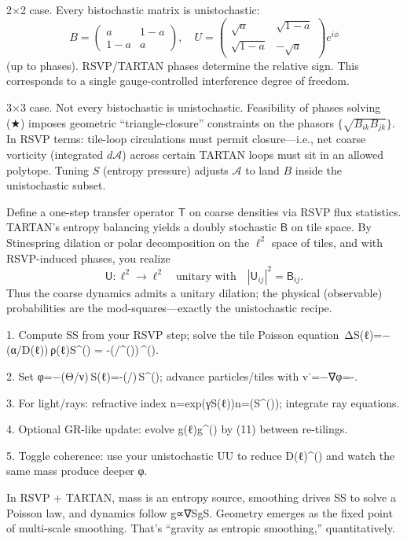\documentclass[11pt]{article}
\theoremstyle{plain}
\theoremstyle{definition}
\begin{document}
2×2 case. Every bistochastic matrix is unistochastic:
\[
B = \begin{pmatrix} a & 1-a \\ 1-a & a \end{pmatrix}, \quad U = \begin{pmatrix} \sqrt{a} & \sqrt{1-a} \\ \sqrt{1-a} & -\sqrt{a} \end{pmatrix} e^{i\phi}
\]
(up to phases). RSVP/TARTAN phases determine the relative sign. This corresponds to a single gauge-controlled interference degree of freedom.

3×3 case. Not every bistochastic is unistochastic. Feasibility of phases solving (★) imposes geometric “triangle-closure” constraints on the phasors $\{\sqrt{B_{ik} B_{jk}}\}$. In RSVP terms: tile-loop circulations must permit closure—i.e., net coarse vorticity (integrated $d\mathcal{A}$) across certain TARTAN loops must sit in an allowed polytope. Tuning $S$ (entropy pressure) adjusts $\mathcal{A}$ to land $B$ inside the unistochastic subset.

Define a one-step transfer operator $\mathsf{T}$ on coarse densities via RSVP flux statistics. TARTAN’s entropy balancing yields a doubly stochastic $\mathsf{B}$ on tile space. By Stinespring dilation or polar decomposition on the $\ell^2$ space of tiles, and with RSVP-induced phases, you realize
\[
\mathsf{U}: \ell^2 \to \ell^2 \quad \text{unitary with} \quad |\mathsf{U}_{ij}|^2 = \mathsf{B}_{ij}.
\]
Thus the coarse dynamics admits a unitary dilation; the physical (observable) probabilities are the mod-squares—exactly the unistochastic recipe.

1. Compute SS from your RSVP step; solve the tile Poisson equation\
   ΔS(ℓ)=−(α/D(ℓ)) ρ(ℓ)\Delta S^{(\ell)} = -(\alpha/^{(\ell)})\,\rho^{(\ell)}.

2. Set φ=−(Θ/ν) S(ℓ)\varphi=-(\Theta/\nu)\,S^{(\ell)}; advance particles/tiles with v˙=−∇φ=-\nabla\varphi.

3. For light/rays: refractive index n=exp⁡(γS(ℓ))n=\exp(\gamma S^{(\ell)}); integrate ray equations.

4. Optional GR-like update: evolve g(ℓ)g^{(\ell)} by (11) between re-tilings.

5. Toggle coherence: use your unistochastic UU to reduce D(ℓ)^{(\ell)} and watch the same mass produce deeper φ\varphi.

In RSVP + TARTAN, mass is an entropy source, smoothing drives SS to solve a Poisson law, and dynamics follow g∝∇S\mathbf g\propto\nabla S. Geometry emerges as the fixed point of multi-scale smoothing. That’s “gravity as entropic smoothing,” quantitatively.
\end{document}
